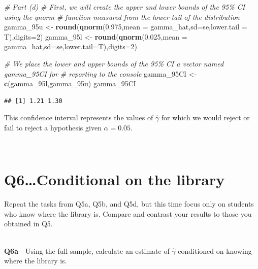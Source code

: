 \documentclass[
]{article}
\newenvironment{Shaded}{\begin{snugshade}}{\end{snugshade}}
\newcommand{\AttributeTok}[1]{\textcolor[rgb]{0.13,0.29,0.53}{#1}}
\newcommand{\CommentTok}[1]{\textcolor[rgb]{0.56,0.35,0.01}{\textit{#1}}}
\newcommand{\DecValTok}[1]{\textcolor[rgb]{0.00,0.00,0.81}{#1}}
\newcommand{\FloatTok}[1]{\textcolor[rgb]{0.00,0.00,0.81}{#1}}
\newcommand{\FunctionTok}[1]{\textcolor[rgb]{0.13,0.29,0.53}{\textbf{#1}}}
\newcommand{\NormalTok}[1]{#1}
\newcommand{\OtherTok}[1]{\textcolor[rgb]{0.56,0.35,0.01}{#1}}
\begin{document}
\begin{Shaded}
\begin{Highlighting}[]
\CommentTok{\# Part (d)}
\CommentTok{\# First, we will create the upper and lower bounds of the 95\% CI using the qnorm}
\CommentTok{\# function measured from the lower tail of the distribution}
\NormalTok{gamma\_95u }\OtherTok{\textless{}{-}} \FunctionTok{round}\NormalTok{(}\FunctionTok{qnorm}\NormalTok{(}\FloatTok{0.975}\NormalTok{,}\AttributeTok{mean =}\NormalTok{ gamma\_hat,}\AttributeTok{sd=}\NormalTok{se,}\AttributeTok{lower.tail =}\NormalTok{ T),}\AttributeTok{digits=}\DecValTok{2}\NormalTok{)}
\NormalTok{gamma\_95l }\OtherTok{\textless{}{-}} \FunctionTok{round}\NormalTok{(}\FunctionTok{qnorm}\NormalTok{(}\FloatTok{0.025}\NormalTok{,}\AttributeTok{mean =}\NormalTok{ gamma\_hat,}\AttributeTok{sd=}\NormalTok{se,}\AttributeTok{lower.tail=}\NormalTok{T),}\AttributeTok{digits=}\DecValTok{2}\NormalTok{)}

\CommentTok{\# We place the lower and upper bounds of the 95\% CI a vector named \textquotesingle{}gamma\_95CI\textquotesingle{} for}
\CommentTok{\# reporting to the console}
\NormalTok{gamma\_95CI }\OtherTok{\textless{}{-}} \FunctionTok{c}\NormalTok{(gamma\_95l,gamma\_95u)}
\NormalTok{gamma\_95CI}
\end{Highlighting}
\end{Shaded}

\begin{verbatim}
## [1] 1.21 1.30
\end{verbatim}

\hfill\break

This confidence interval represents the values of \(\hat{\gamma}\) for
which we would reject or fail to reject a hypothesis given
\(\alpha = 0.05\).\\
\strut \\

\hypertarget{q6conditional-on-the-library}{%
\section{\texorpdfstring{\textbf{Q6\ldots Conditional on the
library}}{Q6\ldots Conditional on the library}}\label{q6conditional-on-the-library}}

Repeat the tasks from Q5a, Q5b, and Q5d, but this time focus only on
students who know where the library is. Compare and contrast your
results to those you obtained in Q5.\\
\strut \\
\textbf{Q6a} - Using the full sample, calculate an estimate of
\(\hat{\gamma}\) conditioned on knowing where the library is.\\
\end{document}
